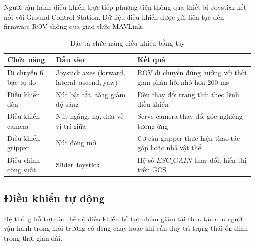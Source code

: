 \documentclass[../DoAn.tex]{subfiles}
\begin{document}
Người vận hành điều khiển trực tiếp phương tiện thông qua thiết bị
Joystick kết nối với Ground Control Station. Dữ liệu điều khiển được gửi
liên tục đến firmware ROV thông qua giao thức MAVLink.


\begin{table}[H]

\centering

\renewcommand{\arraystretch}{1.3}

\begin{tabular}{|l|p{4.5cm}|p{4.5cm}|}

\hline

\textbf{Chức năng} & \textbf{Đầu vào} & \textbf{Kết quả} \\

\hline

Di chuyển 6 bậc tự do &
Joystick axes (forward, lateral, ascend, yaw) &
ROV di chuyển đúng hướng với thời gian phản hồi nhỏ hơn 200 ms\\

\hline

Điều khiển đèn &
Nút bật tắt, tăng giảm độ sáng &
Đèn thay đổi trạng thái theo lệnh điều khiển\\

\hline
Điều khiển camera &
Nút ngẩng, hạ, đưa về vị trí giữa &
Servo camera thay đổi góc nghiêng tương ứng\\

\hline
Điều khiển gripper &
Nút đóng mở &
Cơ cấu gripper thực hiện thao tác gắp hoặc nhả vật thể\\

\hline

Điều chỉnh công suất &
Slider Joystick &
Hệ số $ESC\_GAIN$ thay đổi, hiển thị trên GCS \\

\hline

\end{tabular}

\caption{Đặc tả chức năng điều khiển bằng tay}

\label{tab:manual_control}

\end{table}

\subsection{Điều khiển tự động}

Hệ thống hỗ trợ các chế độ điều khiển hỗ trợ nhằm giảm tải thao tác cho
người vận hành trong môi trường có dòng chảy hoặc khi cần duy trì trạng
thái ổn định trong thời gian dài.
\end{document}
